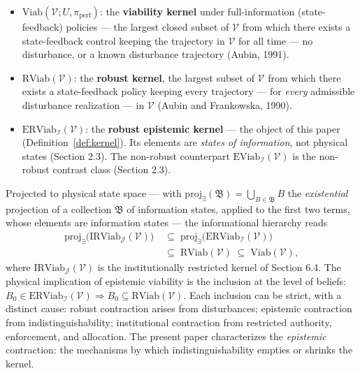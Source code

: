 \documentclass[10pt,twocolumn]{article}
\theoremstyle{definition}
\providecommand{\tightlist}{\setlength{\itemsep}{0pt}\setlength{\parskip}{0pt}}
\begin{document}
\begin{itemize}
\tightlist
\item
  \(\mathrm{Viab}(\mathcal{V}; U, \pi_{\mathrm{perf}})\): the
  \textbf{viability kernel} under full-information (state-feedback)
  policies --- the largest closed subset of \(\mathcal{V}\) from which
  there exists a state-feedback control keeping the trajectory in
  \(\mathcal{V}\) for all time --- no disturbance, or a known
  disturbance trajectory (Aubin, 1991).
\item
  \(\mathrm{RViab}(\mathcal{V})\): the \textbf{robust kernel}, the
  largest subset of \(\mathcal{V}\) from which there exists a
  state-feedback policy keeping every trajectory --- for \emph{every}
  admissible disturbance realization --- in \(\mathcal{V}\) (Aubin and
  Frankowska, 1990).
\item
  \(\mathrm{ERViab}_{\mathcal{I}}(\mathcal{V})\): the \textbf{robust
  epistemic kernel} --- the object of this paper (Definition~\ref{def:kernel}). Its
  elements are \emph{states of information}, not physical states
  (Section 2.3). The non-robust counterpart
  \(\mathrm{EViab}_{\mathcal{I}}(\mathcal{V})\) is the non-robust contrast class (Section 2.3).
\end{itemize}

Projected to physical state space --- with
\(\mathrm{proj}_{\exists}(\mathfrak{B}) = \bigcup_{B \in \mathfrak{B}} B\)
the \emph{existential} projection of a collection \(\mathfrak{B}\) of
information states, applied to the first two terms, whose elements are information states --- the informational hierarchy
reads
\[
\begin{aligned}
\mathrm{proj}_{\exists}\big(\mathrm{IRViab}_{\mathcal{J}}(\mathcal{V})\big)&\;\subseteq\; \mathrm{proj}_{\exists}\big(\mathrm{ERViab}_{\mathcal{I}}(\mathcal{V})\big) \\
&\;\subseteq\; \mathrm{RViab}(\mathcal{V}) \;\subseteq\; \mathrm{Viab}(\mathcal{V}),
\end{aligned}
\]
where \(\mathrm{IRViab}_{\mathcal{J}}(\mathcal{V})\) is the institutionally restricted kernel of Section 6.4. The physical implication of epistemic viability is the
inclusion at the level of beliefs:
\(B_0 \in \mathrm{ERViab}_{\mathcal{I}}(\mathcal{V}) \Rightarrow B_0 \subseteq \mathrm{RViab}(\mathcal{V})\).
Each inclusion can be strict, with a distinct cause: robust contraction
arises from disturbances; epistemic contraction from
indistinguishability; institutional contraction from restricted
authority, enforcement, and allocation. The present paper characterizes
the \emph{epistemic} contraction: the mechanisms by which
indistinguishability empties or shrinks the kernel.
\end{document}
